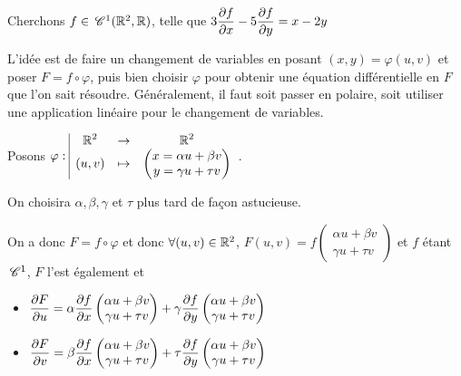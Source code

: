 \begin{exemple}
    Cherchons $f \in \,\mathscr C^{1} (\mathbb{R}^2, \mathbb{R})$, telle que $3 \displaystyle \frac{\partial f}{\partial x} - 5 \frac{\partial f}{\partial y} = x - 2 y$

    L'idée est de faire un changement de variables en posant $(x, y) = \varphi(u, v)$
    et poser $F = f \circ \varphi$, puis bien choisir $\varphi$ pour obtenir une 
    équation différentielle en $F$ que l'on sait résoudre. Généralement, il faut soit 
    passer en polaire, soit utiliser une application linéaire pour le changement de variables.

    \avspace Posons $\varphi: \space \begin{array}{|ccc} \displaystyle \mathbb{R}^2 & \to & \displaystyle \mathbb{R}^2 \\ \displaystyle (u, v) & \mapsto & \displaystyle \begin{pmatrix}
        x = \alpha u + \beta v \\
        y = \gamma u + \tau v 
    \end{pmatrix} \end{array}$.

    On choisira $\alpha, \beta, \gamma$ et $\tau$ plus tard de façon astucieuse.
    
    On a donc $F = f \circ \varphi $ et donc 
    $\forall (u, v) \in \mathbb{R}^2$, $F(u, v) = f \begin{pmatrix}
        \alpha u + \beta v \\
        \gamma u + \tau v
    \end{pmatrix}$
    et $f$ étant $\,\mathscr C^{1}$, $F$ l'est également et 

    \svspace \begin{itemize}
        \item $\displaystyle \frac{\partial F}{\partial u} = \alpha \frac{\partial f}{\partial x} \begin{pmatrix}
            \alpha u + \beta v \\
            \gamma u + \tau v
        \end{pmatrix} + \gamma \frac{\partial f}{\partial y} \begin{pmatrix}
            \alpha u + \beta v \\
            \gamma u + \tau v
        \end{pmatrix}$
        \item $\displaystyle \frac{\partial F}{\partial v} = \beta \frac{\partial f}{\partial x} \begin{pmatrix}
            \alpha u + \beta v \\
            \gamma u + \tau v
        \end{pmatrix} + \tau \frac{\partial f}{\partial y} \begin{pmatrix}
            \alpha u + \beta v \\
            \gamma u + \tau v
        \end{pmatrix}$
    \end{itemize}


\end{exemple}
